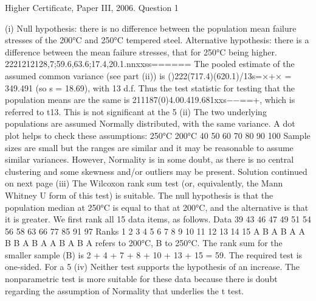 \documentclass[a4paper,12pt]{article}
\begin{document}
Higher Certificate, Paper III, 2006. Question 1

\begin{enumerate}
(i) Null hypothesis: there is no difference between the population mean failure stresses of the 200°C and 250°C tempered steel. Alternative hypothesis: there is a difference between the mean failure stresses, that for 250°C being higher.
2221212128,7;59.6,63.6;17.4,20.1.nnxxss======
The pooled estimate of the assumed common variance (see part (ii)) is ()222(717.4)(620.1)/13s=×+× = 349.491 (so s = 18.69), with 13 d.f.
Thus the test statistic for testing that the population means are the same is
211187(0)4.00.419.681xxs−−==+,
which is referred to t13. This is not significant at the 5%
(ii) The two underlying populations are assumed Normally distributed, with the same variance. A dot plot helps to check these assumptions:
250°C
200°C
40
50
60
70
80
90
100
Sample sizes are small but the ranges are similar and it may be reasonable to assume similar variances. However, Normality is in some doubt, as there is no central clustering and some skewness and/or outliers may be present.
Solution continued on next page
(iii) The Wilcoxon rank sum test (or, equivalently, the Mann Whitney U form of this test) is suitable. The null hypothesis is that the population median at 250°C is equal to that at 200°C, and the alternative is that it is greater. We first rank all 15 data items, as follows.
Data
39
43
46
47
49
51
54
56
58
63
66
77
85
91
97
Ranks
1
2
3
4
5
6
7
8
9
10
11
12
13
14
15
A
B
A
B
A
A
B
B
A
B
A
A
B
A
B
A refers to 200°C, B to 250°C.
The rank sum for the smaller sample (B) is 2 + 4 + 7 + 8 + 10 + 13 + 15 = 59.
The required test is one-sided. For a 5%
(iv) Neither test supports the hypothesis of an increase. The nonparametric test is more suitable for these data because there is doubt regarding the assumption of Normality that underlies the t test.
 \end{enumerate}
 
\end{document}
